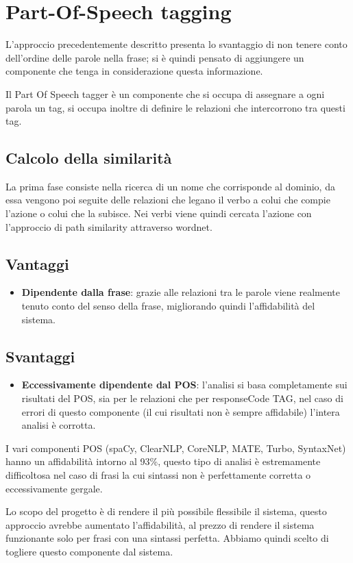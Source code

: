\documentclass[twoside]{supsistudent}
\begin{document}
\section{Part-Of-Speech tagging}
L'approccio precedentemente descritto presenta lo svantaggio di non tenere conto dell'ordine delle parole nella frase; si è quindi pensato di aggiungere un componente che tenga in considerazione questa informazione.

Il Part Of Speech tagger è un componente che si occupa di assegnare a ogni parola un tag, si occupa inoltre di definire le relazioni che intercorrono tra questi tag.\cite{pos}\cite{posCategories}
\subsection{Calcolo della similarità}
La prima fase consiste nella ricerca di un nome che corrisponde al dominio, da essa vengono poi seguite delle relazioni che legano il verbo a colui che compie l'azione o colui che la subisce. Nei verbi viene quindi cercata l'azione con l'approccio di path similarity attraverso wordnet.
\subsection{Vantaggi}
\begin{itemize}
  \item \textbf{Dipendente dalla frase}: grazie alle relazioni tra le parole viene realmente tenuto conto del senso della frase, migliorando quindi l'affidabilità del sistema.
\end{itemize}
\subsection{Svantaggi}
\begin{itemize}
  \item \textbf{Eccessivamente dipendente dal POS}: l'analisi si basa completamente sui risultati del POS, sia per le relazioni che per responseCode TAG, nel caso di errori di questo componente (il cui risultati non è sempre affidabile) l'intera analisi è corrotta.
\end{itemize}
I vari componenti POS (spaCy, ClearNLP, CoreNLP, MATE, Turbo, SyntaxNet) hanno un affidabilità intorno al 93\%\cite{POS_scores}, questo tipo di analisi è estremamente difficoltosa nel caso di frasi la cui sintassi non è perfettamente corretta o eccessivamente gergale.  

Lo scopo del progetto è di rendere il più possibile flessibile il sistema, questo approccio avrebbe aumentato l'affidabilità, al prezzo di rendere il sistema funzionante solo per frasi con una sintassi perfetta. Abbiamo quindi scelto di togliere questo componente dal sistema.
\newpage
\end{document}
